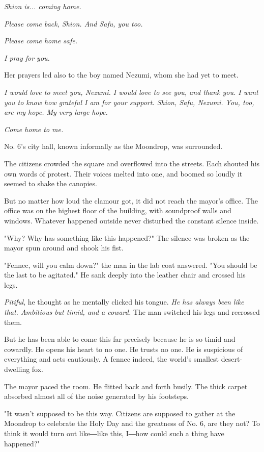 \emph{Shion is... coming home.}

\emph{Please come back, Shion. And Safu, you too.}

\emph{Please come home safe.}

\emph{I pray for you.}

Her prayers led also to the boy named Nezumi, whom she had yet to meet.

\emph{I would love to meet you, Nezumi. I would love to see you, and thank
you. I want you to know how grateful I am for your support. Shion, Safu,
Nezumi. You, too, are my hope. My very large hope.}

\emph{Come home to me.}

\myspace

No. 6's city hall, known informally as the Moondrop, was surrounded.

The citizens crowded the square and overflowed into the streets. Each
shouted his own words of protest. Their voices melted into one, and
boomed so loudly it seemed to shake the canopies.

But no matter how loud the clamour got, it did not reach the mayor's
office. The office was on the highest floor of the building, with
soundproof walls and windows. Whatever happened outside never disturbed
the constant silence inside.

"Why? Why has something like this happened?" The silence was broken as
the mayor spun around and shook his fist.~

"Fennec, will you calm down?" the man in the lab coat answered. "You
should be the last to be agitated." He sank deeply into the leather
chair and crossed his legs.

\emph{Pitiful}, he thought as he mentally clicked his tongue. \emph{He has always
been like that. Ambitious but timid, and a coward.} The man switched his
legs and recrossed them.

But he has been able to come this far precisely because he is so timid
and cowardly. He opens his heart to no one. He trusts no one. He is
suspicious of everything and acts cautiously. A fennec indeed, the
world's smallest desert-dwelling fox.

The mayor paced the room. He flitted back and forth busily. The thick
carpet absorbed almost all of the noise generated by his footsteps.

"It wasn't supposed to be this way. Citizens are supposed to gather at
the Moondrop to celebrate the Holy Day and the greatness of No. 6, are
they not? To think it would turn out like―like this, I―how could such a
thing have happened?"

